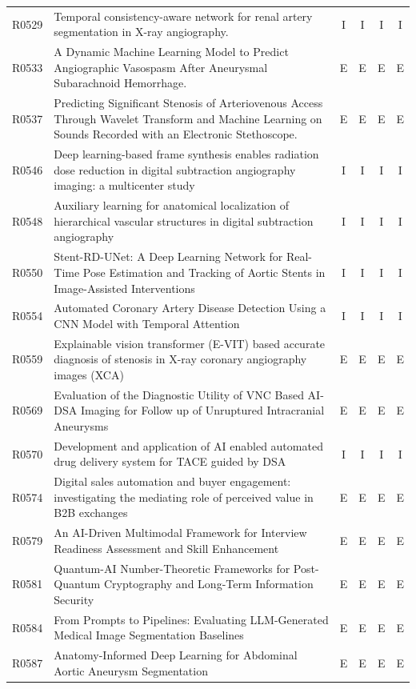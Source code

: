 \begin{longtable}{@{}l p{8.6cm} c c c c@{}}
R0529 & Temporal consistency-aware network for renal artery segmentation in X-ray angiography. & I & I & I & I \\
R0533 & A Dynamic Machine Learning Model to Predict Angiographic Vasospasm After Aneurysmal Subarachnoid Hemorrhage. & E & E & E & E \\
R0537 & Predicting Significant Stenosis of Arteriovenous Access Through Wavelet Transform and Machine Learning on Sounds Recorded with an Electronic Stethoscope. & E & E & E & E \\
R0546 & Deep learning-based frame synthesis enables radiation dose reduction in digital subtraction angiography imaging: a multicenter study & I & I & I & I \\
R0548 & Auxiliary learning for anatomical localization of hierarchical vascular structures in digital subtraction angiography & I & I & I & I \\
R0550 & Stent-RD-UNet: A Deep Learning Network for Real-Time Pose Estimation and Tracking of Aortic Stents in Image-Assisted Interventions & I & I & I & I \\
R0554 & Automated Coronary Artery Disease Detection Using a CNN Model with Temporal Attention & I & I & I & I \\
R0559 & Explainable vision transformer (E-VIT) based accurate diagnosis of stenosis in X-ray coronary angiography images (XCA) & E & E & E & E \\
R0569 & Evaluation of the Diagnostic Utility of VNC Based AI-DSA Imaging for Follow up of Unruptured Intracranial Aneurysms & E & E & E & E \\
R0570 & Development and application of AI enabled automated drug delivery system for TACE guided by DSA & I & I & I & I \\
R0574 & Digital sales automation and buyer engagement: investigating the mediating role of perceived value in B2B exchanges & E & E & E & E \\
R0579 & An AI-Driven Multimodal Framework for Interview Readiness Assessment and Skill Enhancement & E & E & E & E \\
R0581 & Quantum-AI Number-Theoretic Frameworks for Post-Quantum Cryptography and Long-Term Information Security & E & E & E & E \\
R0584 & From Prompts to Pipelines: Evaluating LLM-Generated Medical Image Segmentation Baselines & E & E & E & E \\
R0587 & Anatomy-Informed Deep Learning for Abdominal Aortic Aneurysm Segmentation & E & E & E & E \\

\end{longtable}
